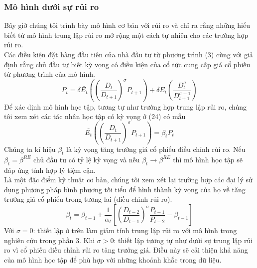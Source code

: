 \documentclass[10pt,a4paper]{article}
\begin{document}
	\subsubsection{Mô hình dưới sự rủi ro}
	Bây giờ chúng tôi trình bày mô hình cơ bản với rủi ro và chỉ ra rằng
	những hiểu biết từ mô hình trung lập rủi ro mở rộng một cách tự nhiên cho các trường hợp
	rủi ro.\\
	
	Các điều kiện đặt hàng đầu tiên của nhà đầu tư từ phương trình (3) cùng với giả định rằng
	chủ đầu tư biết kỳ vọng có điều kiện của cổ tức cung cấp giá cổ phiếu từ phương trình của mô hình.\
	\begin{equation}
	P_t=\delta\bar{E_t}\left(\left(\frac{D_t}{D_{t+1}}\right)^{\sigma} P_{t+1}\right)+\delta E_t\left(\frac{D^{\sigma}_t}{D^{\sigma -1}_{t+1}}\right)
	\end{equation}
	Để xác định mô hình học tập, tương tự như trường hợp trung lập rủi ro, chúng tôi
	xem xét các tác nhân học tập có kỳ vọng ở (24) có mẫu
	\begin{equation}
	\bar{E_t}\left(\left(\frac{D_t}{D_{t+1}}\right)^{\sigma} P_{t+1}\right)=\beta_tP_t
	\end{equation}
	Chúng ta kí hiệu $\beta_t$ là kỳ vọng tăng trưởng giá cổ phiếu điều chỉnh rủi ro. Nếu $\beta_t=\beta^{RE}$ chủ đầu tư có tỷ lệ kỳ vọng và nếu $\beta_t \to \beta^{RE}$ thì mô hình học tập sẽ đáp ứng tính hợp lý tiệm cận.\\
	Là một đặc điểm kỹ thuật cơ bản, chúng tôi xem xét lại trường hợp các đại lý sử dụng phương pháp bình phương tối tiểu để hình thành kỳ vọng của họ về tăng trưởng giá cổ phiếu trong tương lai (điều chỉnh rủi ro).
	\begin{equation}
	\beta_t=\beta_{t-1}+\frac{1}{\alpha_t}\left[\left(\frac{D_{t-2}}{D_{t-1}}\right)^{\sigma}\frac{P_{t-1}}{P_{t-2}}-\beta_{t-1}\right]
	\end{equation}
	Với $\sigma=0$: thiết lập ở trên làm giảm tính trung lập rủi ro với mô hình trong 
	nghiên cứu trong phần 3. Khi $\sigma >0$: thiết lập tương tự như dưới sự trung lập rủi ro vì cổ phiếu điều chỉnh rủi ro tăng trưởng giá.
	Điều này sẽ cải thiện khả năng của mô hình học tập để phù hợp với những khoảnh khắc trong dữ liệu.\\
	
\end{document}

